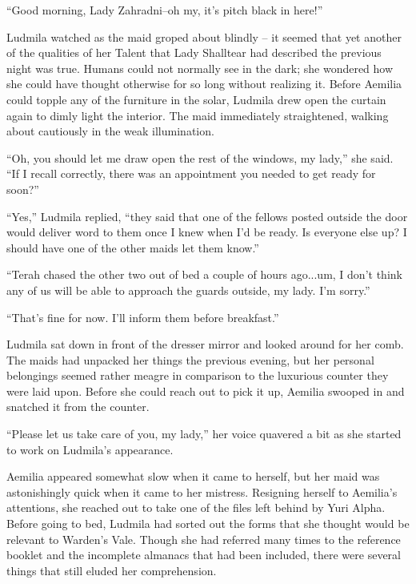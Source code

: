 

“Good morning, Lady Zahradni–oh my, it’s pitch black in here!”

 

Ludmila watched as the maid groped about blindly – it seemed that yet another of the qualities of her Talent that Lady Shalltear had described the previous night was true. Humans could not normally see in the dark; she wondered how she could have thought otherwise for so long without realizing it. Before Aemilia could topple any of the furniture in the solar, Ludmila drew open the curtain again to dimly light the interior. The maid immediately straightened, walking about cautiously in the weak illumination.

 

“Oh, you should let me draw open the rest of the windows, my lady,” she said. “If I recall correctly, there was an appointment you needed to get ready for soon?”

 

“Yes,” Ludmila replied, “they said that one of the fellows posted outside the door would deliver word to them once I knew when I'd be ready. Is everyone else up? I should have one of the other maids let them know.”

 

“Terah chased the other two out of bed a couple of hours ago...um, I don’t think any of us will be able to approach the guards outside, my lady. I’m sorry.”

 

“That’s fine for now. I’ll inform them before breakfast.”

 

Ludmila sat down in front of the dresser mirror and looked around for her comb. The maids had unpacked her things the previous evening, but her personal belongings seemed rather meagre in comparison to the luxurious counter they were laid upon. Before she could reach out to pick it up, Aemilia swooped in and snatched it from the counter.

 

“Please let us take care of you, my lady,” her voice quavered a bit as she started to work on Ludmila’s appearance.

 

Aemilia appeared somewhat slow when it came to herself, but her maid was astonishingly quick when it came to her mistress. Resigning herself to Aemilia’s attentions, she reached out to take one of the files left behind by Yuri Alpha. Before going to bed, Ludmila had sorted out the forms that she thought would be relevant to Warden’s Vale. Though she had referred many times to the reference booklet and the incomplete almanacs that had been included, there were several things that still eluded her comprehension.

